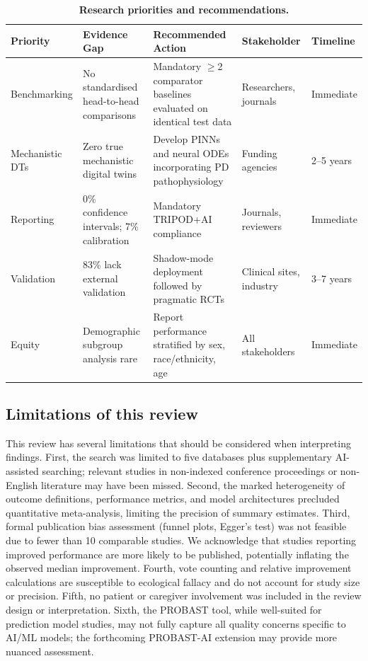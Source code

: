 \documentclass[11pt,a4paper]{article}
\begin{document}
\begin{table}[H]
\centering
\caption{\textbf{Research priorities and recommendations.}}
\label{tab:priorities}
\small
\begin{tabularx}{\textwidth}{@{}lXXll@{}}
\toprule
\textbf{Priority} & \textbf{Evidence Gap} & \textbf{Recommended Action} & \textbf{Stakeholder} & \textbf{Timeline} \\
\midrule
Benchmarking & No standardised head-to-head comparisons & Mandatory $\geq$2 comparator baselines evaluated on identical test data & Researchers, journals & Immediate \\
Mechanistic DTs & Zero true mechanistic digital twins & Develop PINNs and neural ODEs incorporating PD pathophysiology & Funding agencies & 2--5 years \\
Reporting & 0\% confidence intervals; 7\% calibration & Mandatory TRIPOD+AI compliance & Journals, reviewers & Immediate \\
Validation & 83\% lack external validation & Shadow-mode deployment followed by pragmatic RCTs & Clinical sites, industry & 3--7 years \\
Equity & Demographic subgroup analysis rare & Report performance stratified by sex, race/ethnicity, age & All stakeholders & Immediate \\
\bottomrule
\end{tabularx}
\end{table}

\subsection{Limitations of this review}

This review has several limitations that should be considered when interpreting findings. First, the search was limited to five databases plus supplementary AI-assisted searching; relevant studies in non-indexed conference proceedings or non-English literature may have been missed. Second, the marked heterogeneity of outcome definitions, performance metrics, and model architectures precluded quantitative meta-analysis, limiting the precision of summary estimates. Third, formal publication bias assessment (funnel plots, Egger's test) was not feasible due to fewer than 10 comparable studies. We acknowledge that studies reporting improved performance are more likely to be published, potentially inflating the observed median improvement. Fourth, vote counting and relative improvement calculations are susceptible to ecological fallacy and do not account for study size or precision. Fifth, no patient or caregiver involvement was included in the review design or interpretation. Sixth, the PROBAST tool, while well-suited for prediction model studies, may not fully capture all quality concerns specific to AI/ML models; the forthcoming PROBAST-AI extension may provide more nuanced assessment.
\end{document}
